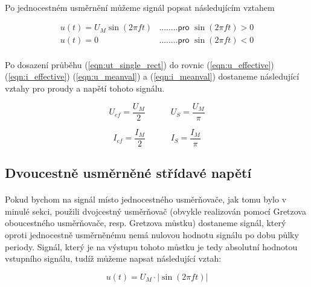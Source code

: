 \documentclass{praktikum}
\begin{document}
\paragraph{}
Po jednocestném usměrnění můžeme signál popsat následujícím vztahem

\begin{equation}
\label{eqn:ut_single_rect}
\begin{split}
u(t) = U_M \sin(2 \pi ft)  & \textsf{........pro }  \sin(2 \pi ft) > 0 \\
u(t) = 0 & \textsf{........pro } \sin(2 \pi ft) < 0
\end{split}
\end{equation}

\paragraph{}
Po dosazení průběhu (\ref{eqn:ut_single_rect}) do rovnic (\ref{eqn:u_effective}) (\ref{eqn:i_effective}) (\ref{eqn:u_meanval}) a (\ref{eqn:i_meanval}) dostaneme následující vztahy pro proudy a napětí tohoto signálu.

\begin{equation}
\label{eqn:u_eff_mean_single_rect}
U_{ef} = \frac{U_M}{2} \quad \quad \quad 
U_S = \frac{U_M}{\pi}
\end{equation}

\begin{equation}
\label{eqn:i_eff_mean_single_rect}
I_{ef} = \frac{I_M}{2} \quad \quad \quad 
I_S = \frac{I_M}{\pi}
\end{equation}

\subsection{Dvoucestně usměrněné střídavé napětí}
\paragraph{}
Pokud bychom na signál místo jednocestného usměrňovače, jak tomu bylo v minulé sekci, použili dvojcestný usměrňovač (obvykle realizován pomocí Gretzova oboucestného usměrňovače, resp. Gretzova můstku) dostaneme signál, který oproti jednocestně usměrněnému nemá nulovou hodnotu signálu po dobu půlky periody. Signál, který je na výstupu tohoto můstku je tedy absolutní hodnotou vstupního signálu, tudíž můžeme napsat následující vztah:

\begin{equation}
\label{eqn:ut_fullbridge_rect}
u(t) = U_M \cdot |\sin(2 \pi ft)|
\end{equation}
\end{document}
